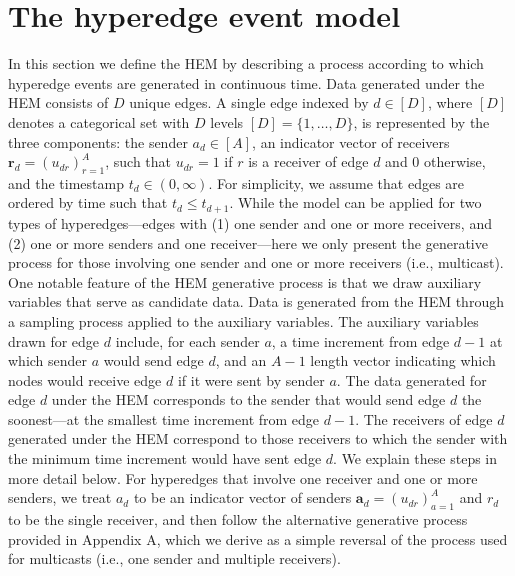 \documentclass[ba]{imsart}
\numberwithin{equation}{section}
\theoremstyle{plain}
\begin{document}
	\section{The hyperedge event model}\label{sec:generative process}
	
	In this section we define the HEM by describing a process according to which hyperedge events are generated in continuous time. Data generated under the HEM consists of $D$ unique edges. A single edge indexed by $d \in [D]$, where $[D]$ denotes a categorical set with $D$ levels $[D] = \{1,\ldots,D\}$, is represented by the three components: the sender $a_d \in [A]$, an indicator vector of receivers $\boldsymbol{r}_d = (u_{dr})_{r=1}^{A}$, such that $u_{dr}=1$ if $r$ is a receiver of edge $d$ and 0 otherwise, and the timestamp $t_d \in (0, \infty)$. For simplicity, we assume that edges are ordered by time such that $t_d \leq t_{d+1}$. While the model can be applied for two types of hyperedges---edges with (1) one sender and one or more receivers, and (2) one or more senders and one receiver---here we only present the generative process for those involving one sender and one or more receivers (i.e., multicast). One notable feature of the HEM generative process is that we draw auxiliary variables that serve as candidate data. Data is generated from the HEM through a sampling process applied to the auxiliary variables. The auxiliary variables drawn for edge $d$ include, for each sender $a$, a time increment from edge $d-1$ at which sender $a$ would send edge $d$, and an $A-1$ length vector indicating which nodes would receive edge $d$ if it were sent by sender $a$.  The data generated for edge $d$ under the HEM corresponds to the sender that would send edge $d$ the soonest---at the smallest time increment from edge $d-1$. The receivers of edge $d$ generated under the HEM correspond to those receivers to which the sender with the minimum time increment would have sent edge $d$. We explain these steps in more detail below. For hyperedges that involve one receiver and one or more senders, we treat $a_d$ to be an indicator vector of senders $\boldsymbol{a}_d = (u_{dr})_{a=1}^{A}$ and $r_d$ to be the single receiver, and then follow the alternative generative process provided in Appendix A, which we derive as a simple reversal of the process used for multicasts (i.e., one sender and multiple receivers). 
	
\end{document}
